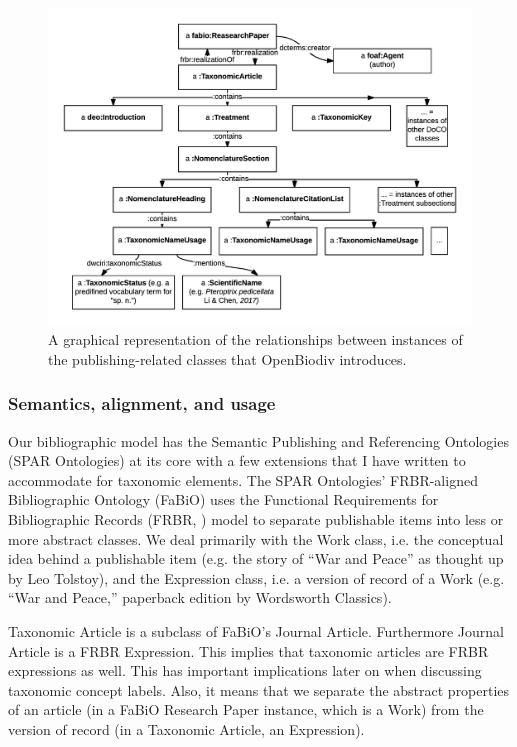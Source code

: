 \begin{figure}[h!]
	\centering
	\includegraphics[width=\textwidth]{Figures/taxonomic-article-diagram}
	\decoRule
  \caption[Taxonomic article diagram.]{A graphical representation of the relationships between instances of the publishing-related classes that OpenBiodiv introduces.}
  \label{taxonomic-article-diagram}
\end{figure}

\subsubsection{Semantics, alignment, and usage}

Our bibliographic model has the Semantic Publishing and Referencing Ontologies (SPAR Ontologies) at its core with a few extensions that I have written to accommodate for taxonomic elements. The SPAR Ontologies' FRBR-aligned Bibliographic Ontology (FaBiO) uses the Functional Requirements for Bibliographic Records (FRBR, \cite{tillett_conceptual_2003}) model to separate publishable items into less or more abstract classes. We deal primarily with the Work class, i.e. the conceptual idea behind a publishable item (e.g. the story of ``War and Peace'' as thought up by Leo Tolstoy), and the Expression class, i.e. a version of record of a Work (e.g. ``War and Peace,'' paperback edition by Wordsworth Classics).

Taxonomic Article is a subclass of FaBiO's Journal Article. Furthermore Journal Article is a FRBR Expression. This implies that taxonomic articles are FRBR expressions as well. This has important implications later on when discussing taxonomic concept labels. Also, it means that we separate the abstract properties of an article (in a FaBiO Research Paper instance, which is a Work) from the version of record (in a Taxonomic Article, an Expression).

